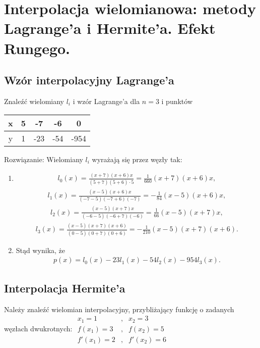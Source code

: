 \documentclass[main.tex]{subfiles}
\begin{document}
    \newpage

    \section{Interpolacja wielomianowa: metody Lagrange'a i Hermite'a. Efekt Rungego.}

    \subsection{Wzór interpolacyjny Lagrange'a}
    \begin{exercise}
        Znaleźć wielomiany $l_i$ i wzór Lagrange'a dla $n=3$ i punktów
        \begin{tabular}{|c|c|c|c|c|}
            \hline
            x & 5 & -7 & -6 & 0    \\ \hline
            y & 1 & -23 & -54 & -954 \\ \hline
        \end{tabular}
    \end{exercise}
    Rozwiązanie:
    Wielomiany $l_i$ wyrażają się przez węzły tak:
    \begin{enumerate}
        \item
        \begin{align*}
            l_0(x)=\frac{(x+7)(x+6)x}{(5+7)(5+6)\cdot5}=\frac{1}{660}(x+7)(x+6)x,
        \end{align*}
        \begin{align*}
            l_1(x)=\frac{(x-5)(x+6)x}{(-7-5)(-7+6)(-7)}=-\frac{1}{84}(x-5)(x+6)x,
        \end{align*}
        \begin{align*}
            l_2(x)=\frac{(x-5)(x+7)x}{(-6-5)(-6+7)(-6)}=\frac{1}{66}(x-5)(x+7)x,
        \end{align*}
        \begin{align*}
            l_3(x)=\frac{(x-5)(x+7)(x+6)}{(0-5)(0+7)(0+6)}=-\frac{1}{210}(x-5)(x+7)(x+6).
        \end{align*}


        \item
        Stąd wynika, że
        \begin{align*}
            p(x)=l_0(x)-23l_1(x)-54l_2(x)-954l_3(x).
        \end{align*}
    \end{enumerate}

    \subsection{Interpolacja Hermite’a}
    \begin{exercise}
        Należy znaleźć wielomian interpolacyjny, przybliżający funkcję o zadanych węzłach dwukrotnych:
        ${\begin{array}{lcl}
              x_{1}=1&,&x_{2}=3\\f(x_{1})=3&,&f(x_{2})=5\\f'(x_{1})=2&,&f'(x_{2})=6
        \end{array}}$
    \end{exercise}
\end{document}
